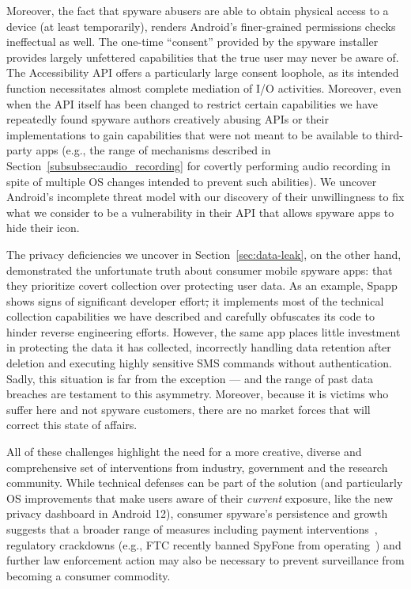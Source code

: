 \documentclass[sigconf,balance=false]{acmart}
\providecommand{\DIFadd}[1]{{\protect\color{blue}\uwave{#1}}} %
\providecommand{\DIFdel}[1]{{\protect\color{red}\sout{#1}}}                      %
\providecommand{\DIFaddbegin}{} %
\providecommand{\DIFaddend}{} %
\providecommand{\DIFdelbegin}{} %
\providecommand{\DIFdelend}{} %
\newcommand{\DIFscaledelfig}{0.5}
\newlength{\DIFdelgraphicswidth} %
\newlength{\DIFdelgraphicsheight} %
\newcommand{\DIFaddincludegraphics}[2][]{{\color{blue}\fbox{\DIFOincludegraphics[#1]{#2}}}} %
\newcommand{\DIFdelincludegraphics}[2][]{%
\sbox{\DIFdelgraphicsbox}{\DIFOincludegraphics[#1]{#2}}%
\settoboxwidth{\DIFdelgraphicswidth}{\DIFdelgraphicsbox} %
\settoboxtotalheight{\DIFdelgraphicsheight}{\DIFdelgraphicsbox} %
\scalebox{\DIFscaledelfig}{%
\parbox[b]{\DIFdelgraphicswidth}{\usebox{\DIFdelgraphicsbox}\\[-\baselineskip] \rule{\DIFdelgraphicswidth}{0em}}\llap{\resizebox{\DIFdelgraphicswidth}{\DIFdelgraphicsheight}{%
\setlength{\unitlength}{\DIFdelgraphicswidth}%
\begin{picture}(1,1)%
\thicklines\linethickness{2pt} %
{\color[rgb]{1,0,0}\put(0,0){\framebox(1,1){}}}%
{\color[rgb]{1,0,0}\put(0,0){\line( 1,1){1}}}%
{\color[rgb]{1,0,0}\put(0,1){\line(1,-1){1}}}%
\end{picture}%
}\hspace*{3pt}}} %
} %
\DeclareRobustCommand{\DIFaddbegin}{\DIFOaddbegin \let\includegraphics\DIFaddincludegraphics} %
\DeclareRobustCommand{\DIFaddend}{\DIFOaddend \let\includegraphics\DIFOincludegraphics} %
\DeclareRobustCommand{\DIFdelbegin}{\DIFOdelbegin \let\includegraphics\DIFdelincludegraphics} %
\DeclareRobustCommand{\DIFdelend}{\DIFOaddend \let\includegraphics\DIFOincludegraphics} %
\begin{document}
Moreover, the fact that spyware abusers are able to obtain physical
access to a device (at least temporarily), renders Android's
finer-grained permissions checks ineffectual as well.  The one-time
``consent'' provided by the spyware installer provides largely
unfettered capabilities that the true user may never be aware of.  The
Accessibility API offers a particularly large consent loophole, as its
intended function necessitates almost complete mediation of I/O
activities.  Moreover, even when the API itself has been changed to
restrict certain capabilities we have repeatedly found spyware authors
creatively abusing APIs or their implementations to gain capabilities
that were not meant to be available to third-party apps
(e.g., the range of mechanisms described in
Section~\ref{subsubsec:audio_recording} for covertly performing audio
recording in spite of multiple OS changes intended to prevent such
abilities). We uncover Android's incomplete threat model
with our discovery of their unwillingness to fix what
we consider to be a vulnerability in their API that allows spyware apps to
hide their icon.

The privacy deficiencies we uncover in Section~\ref{sec:data-leak}, on
the other hand, demonstrated the unfortunate truth about consumer
mobile spyware apps: that they prioritize covert collection over
protecting user data.  As an example, Spapp shows signs of
significant developer effort\DIFdelbegin \DIFdel{, }\DIFdelend \DIFaddbegin \DIFadd{: }\DIFaddend it implements most of the technical
collection capabilities we have described and carefully obfuscates its
code to hinder reverse engineering efforts. However, the same app
places little investment in protecting the data it has collected,
incorrectly handling data retention after deletion and executing
highly sensitive SMS commands without authentication.  Sadly, this
situation is far from the exception --- and the range of past data
breaches are testament to this asymmetry.  Moreover, because it is
victims who suffer here and not spyware customers, there are no market
forces that will correct this state of affairs.

All of these challenges highlight the need for a more creative,
diverse and comprehensive set of interventions from industry,
government and the research community.  While technical defenses can
be part of the solution (and particularly OS improvements that make
users aware of their \emph{current} exposure, like the new privacy
dashboard in Android 12), consumer spyware's persistence and growth
suggests that a broader range of measures including payment
interventions~\cite{mccoy2012priceless}, regulatory crackdowns (e.g., FTC
recently banned SpyFone from operating~\cite{FTCFinal26:online}) and
further law enforcement action may also be necessary to prevent
surveillance from becoming a consumer commodity.
\end{document}
